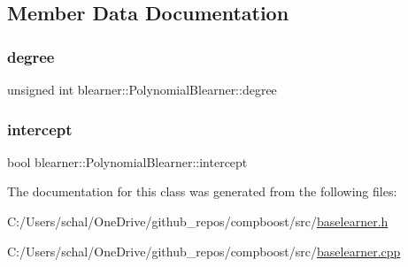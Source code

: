\subsection{Member Data Documentation}
\mbox{\label{classblearner_1_1_polynomial_blearner_a7a522e19634367a4bfad2d6ea532ec44}} 
\subsubsection{\texorpdfstring{degree}{degree}}
{\footnotesize\ttfamily unsigned int blearner\+::\+Polynomial\+Blearner\+::degree\hspace{0.3cm}{\ttfamily [private]}}

\mbox{\label{classblearner_1_1_polynomial_blearner_af16d0f9f97179d9b23ec8796a0c74709}} 
\subsubsection{\texorpdfstring{intercept}{intercept}}
{\footnotesize\ttfamily bool blearner\+::\+Polynomial\+Blearner\+::intercept\hspace{0.3cm}{\ttfamily [private]}}



The documentation for this class was generated from the following files\+:\begin{DoxyCompactItemize}
\item 
C\+:/\+Users/schal/\+One\+Drive/github\+\_\+repos/compboost/src/\mbox{\hyperlink{baselearner_8h}{baselearner.\+h}}\item 
C\+:/\+Users/schal/\+One\+Drive/github\+\_\+repos/compboost/src/\mbox{\hyperlink{baselearner_8cpp}{baselearner.\+cpp}}\end{DoxyCompactItemize}
